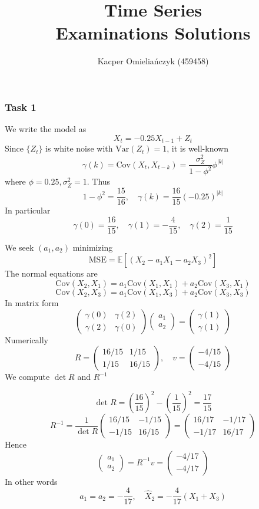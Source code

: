 \documentclass[11pt,a4paper]{article}
\newcommand{\EE}{\mathbb E}
\newcommand{\var}{\mathrm{Var}}
\newcommand{\cov}{\mathrm{Cov}}
\begin{document}
    \title{Time Series \\ Examinations Solutions}
    \author{Kacper Omieliańczyk (459458)}
    \date{}

    \maketitle
    \subsubsection*{Task 1}
    We write the model as \[ X_t = -0.25 X_{t-1} + Z_t \]
    Since $\{Z_t\}$ is white noise with $\var(Z_t) = 1$, it is well-known
    \[ \gamma(k) = \cov(X_t, X_{t-k}) = \frac{\sigma_Z^2}{1-\phi^2} \phi^{|k|} \]
    where $\phi = 0.25, \sigma_Z^2 = 1$. Thus
    \[ 1 - \phi^2 = \frac{15}{16}, \quad \gamma(k) = \frac{16}{15} (-0.25)^{|k|} \]
    In particular
    \[ \gamma(0) = \frac{16}{15}, \quad \gamma(1) = -\frac4{15}, \quad \gamma(2) = \frac1{15} \]
    
    We seek $(a_1, a_2)$ minimizing
    \[ \mathrm{MSE} = \EE\left[ (X_2 - a_1 X_1 - a_2 X_3)^2 \right] \]
    The normal equations are
    \[ \cov(X_2, X_1) = a_1 \cov(X_1, X_1) + a_2 \cov(X_3, X_1) \]
    \[ \cov(X_2, X_3) = a_1 \cov(X_1, X_3) + a_2 \cov(X_3, X_3) \]
    In matrix form
    \[ \begin{pmatrix} \gamma(0) & \gamma(2) \\ \gamma(2) & \gamma(0) \end{pmatrix} \begin{pmatrix} a_1 \\ a_2 \end{pmatrix} = \begin{pmatrix} \gamma(1) \\ \gamma(1) \end{pmatrix} \]
    Numerically 
    \[ R = \begin{pmatrix} 16/15 & 1/15 \\ 1/15 & 16/15 \end{pmatrix}, \quad v = \begin{pmatrix} -4/15 \\ -4/15 \end{pmatrix} \]
    We compute $\det R$ and $R^{-1}$
    
     \[   \det R = \left(\frac{16}{15}\right)^2 - \left( \frac1{15}\right)^2 = \frac{17}{15} \]
       \[ R^{-1} = \frac1{\det R} \begin{pmatrix} 16/15 & -1/15 \\ -1/15 & 16/15 \end{pmatrix} = \begin{pmatrix} 16/17 & -1/17 \\ -1/17 & 16/17 \end{pmatrix}\]
    Hence
    \[ \begin{pmatrix} a_1 \\ a_2 \end{pmatrix} = R^{-1} v = \begin{pmatrix} -4/17 \\ -4/17 \end{pmatrix} \]
    In other words
    \[ a_1 = a_2 = -\frac{4}{17},\quad \hat X_2 = -\frac{4}{17} (X_1+X_3) \]
\end{document}
